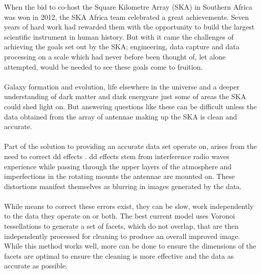 When the bid to co-host the Square Kilometre Array (SKA) in Southern Africa was won in 2012, the SKA Africa team celebrated a great achievements. Seven years of hard work had rewarded them with the opportunity to build the largest scientific instrument in human history. But with it came the challenges of achieving the goals set out by the SKA; engineering, data capture and data processing on a scale which had never before been thought of, let alone attempted, would be needed to see these goals come to fruition.
\\
\\
Galaxy formation and evolution, life elsewhere in the universe and a deeper understanding of dark matter and dark energy\footnotemark are just some of areas the SKA could shed light on. But answering questions like these can be difficult unless the data obtained from the array of antennae making up the SKA is clean and accurate.
\\
\\
Part of the solution to providing an accurate data set operate on, arises from the need to correct \gls{dd} effects \citep{smirnov2011revisiting}. \gls{dd} effects stem from interference radio waves experience while passing through the upper layers of the atmosphere and imperfections in the rotating mounts the antennae are mounted on. These distortions manifest themselves as blurring in images generated by the data.
\\
\\
While means to correct these errors exist, they can be slow, work independently to the data they operate on or both. The best current model uses Voronoi tessellations \citep{okabe2009spatial} to generate a set of facets, which do not overlap, that are then independently processed for cleaning to produce an overall improved image. While this method works well, more can be done to ensure the dimensions of the facets are optimal to ensure the cleaning is more effective and the data as accurate as possible.
